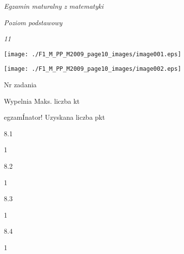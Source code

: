 \documentclass[a4paper,12pt]{article}
\begin{document}
{\it Egzamin maturalny z matematyki}

{\it Poziom podstawowy}

{\it 11}
\begin{center}
\texttt{[image: ./F1\_M\_PP\_M2009\_page10\_images/image001.eps]}

\texttt{[image: ./F1\_M\_PP\_M2009\_page10\_images/image002.eps]}
\end{center}
Nr zadania

Wypelnia Maks. liczba kt

egzamÍnator! Uzyskana liczba pkt

8.1

1

8.2

1

8.3

1

8.4

1
\end{document}
